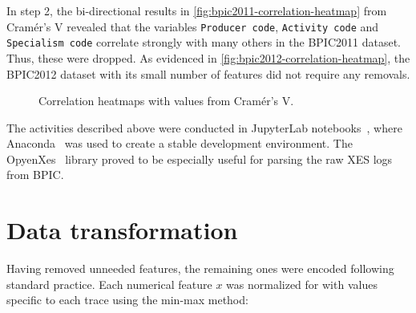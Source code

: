 In step 2, the bi-directional results in \autoref{fig:bpic2011-correlation-heatmap} from Cramér's V revealed that the variables \texttt{Producer code}, \texttt{Activity code} and \texttt{Specialism code} correlate strongly with many others in the BPIC2011 dataset. Thus, these were dropped. As evidenced in \autoref{fig:bpic2012-correlation-heatmap}, the BPIC2012 dataset with its small number of features did not require any removals.

\begin{figure}
\centering
{}
\qquad
{}
\caption{Correlation heatmaps with values from Cramér's V.}
\end{figure}

The activities described above were conducted in JupyterLab notebooks~\cite{web:jupyter}, where Anaconda~\cite{web:anaconda} was used to create a stable development environment. The OpyenXes~\cite{web:opyenxes} library proved to be especially useful for parsing the raw XES logs from BPIC.

\section{Data transformation}
\label{sec:eval:data-transformation}
Having removed unneeded features, the remaining ones were encoded following standard practice. Each numerical feature $x$ was normalized for with values specific to each trace using the min-max method:

